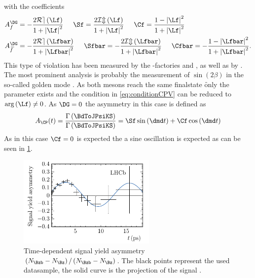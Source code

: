 with the \CP coefficients
\begin{align}
A_f^{\DG}&=-\frac{2\mathcal{Re}\left(\Lf\right)}{1+\left|\Lf\right|^2}\hspace{0.5cm}
\Sf=\frac{2\mathcal{Im}\left(\Lf\right)}{1+\left|\Lf\right|^2}\hspace{0.5cm}
\Cf=\frac{1-\left|\Lf\right|^2}{1+\left|\Lf\right|^2}\\
A_{\kern 1.5pt\overline{\kern -1.5pt f\kern 1.5pt}}^{\DG}&=-\frac{2\mathcal{Re}\left(\Lfbar\right)}{1+\left|\Lfbar\right|^2}\hspace{0.5cm}
\Sfbar=-\frac{2\mathcal{Im}\left(\Lfbar\right)}{1+\left|\Lfbar\right|^2}\hspace{0.5cm}
\Cfbar=-\frac{1-\left|\Lfbar\right|^2}{1+\left|\Lfbar\right|^2}.
\end{align}
This type of \CP violation has been measured by the \B-factories \belle and \babar, as well as by \lhcb.
The most prominent analysis is probably the measurement of $\sin\left(2\beta\right)$ in the so-called golden mode \BdToJPsiKS \cite{Aaij:2015vza}.
As both \Bz mesons reach the same finalstate \f only the parameter \Lf exists and the condition in \cref{eq:conditionCPV} can be reduced to $\arg\left(\Lf\right)\neq0$.
As $\DG=0$ the \CP asymmetry in this case is defined as
\begin{equation}
A_{\CP}(t)=\frac{\Gamma\left(\BdToJPsiKS\right)}{\Gamma\left(\BdToJPsiKS\right)}=\Sf\sin\left(\dmd t\right)+\Cf\cos\left(\dmd t\right)
\end{equation}
As in this case $\Cf=0$ is expected the a sine oscillation is expected as can be seen in \cref{fig:sin2beta}.
\begin{figure}[tbp]
	\centering
	\includegraphics[width=0.6\textwidth]{03CPV/figs/InterferenceCPV.pdf}
	\caption{Time-dependent signal yield asymmetry $\left(N_{\Bzb}-N_{\Bz}\right)/\left(N_{\Bzb}-N_{\Bz}\right)$. The black points represent the used datasample, the solid curve is the projection of the signal \PDF.}
	\label{fig:sin2beta}
\end{figure}
